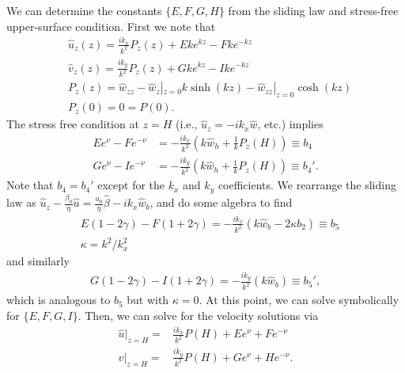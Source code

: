 \documentclass[paper=a4, fontsize=11pt]{article}
\begin{document}
We can determine the constants $\{E,F,G,H\}$ from the sliding law and stress-free
upper-surface condition.
First we note that
\begin{align}
&\widehat{u}_z(z) = \frac{ik_x }{k^2} P_z(z)
+ E k e^{kz} - F k e^{-kz} \\
&\widehat{v}_z(z) = \frac{ik_y }{k^2} P_z(z) + G k  e^{kz} - I k e^{-kz} \\
&P_z(z) = \widehat{w}_{zz}-\widehat{w}_z|_{z=0}k\sinh(kz) - \widehat{w}_{zz}|_{z=0}\cosh(kz)\\
&P_z(0) = 0 = P(0).
\end{align}
The stress free condition at $z=H$ (i.e., $\widehat{u}_z = -ik_x \widehat{w}$, etc.)
implies
\begin{align}
 E  e^{\nu} - F  e^{-\nu} &= -\frac{ik_x}{k^2} \left(k\widehat{w}_h+\frac{1}{k}P_{z}(H)\right)\equiv b_4 \\
  G  e^{\nu} - I  e^{-\nu} &= -\frac{ik_y}{k^2} \left(k\widehat{w}_h+\frac{1}{k}P_{z}(H)\right) \equiv b_4'.
\end{align}
Note that $b_4=b_4'$ except for the $k_x$ and $k_y$ coefficients.
We rearrange the sliding law as $\widehat{u}_z - \frac{\beta_0}{\eta}\widehat{u}=\frac{u_0}{\eta}\widehat{\beta}
-ik_x\widehat{w}_b$, and do some algebra to find
\begin{align}
&E (1-2\gamma) - F (1+2\gamma) =
-\frac{ik_x}{k^2}\left(k\widehat{w}_b-2\kappa b_2 \right)  \equiv b_5 \\
&\kappa = {k}^2/k_x^2
\end{align}
and similarly
\begin{align}
G (1-2\gamma) -I (1+2\gamma) = -\frac{ik_y}{k^2}(k\widehat{w}_b) \equiv b_5',
\end{align}
which is analogous to $b_5$ but with $\kappa=0$.
At this point, we can solve symbolically for $\{E,F,G,I\}$.
Then, we can solve for the velocity solutions via
\begin{align}
\widehat{u}|_{z=H} =&  \frac{ik_x }{k^2} P(H) + E e^{\nu} + F e^{-\nu}  \\
\widehat{v}|_{z=H} =& \frac{ik_y }{k^2} P(H)+ G e^{\nu} + H e^{-\nu}.
\end{align}
\end{document}
